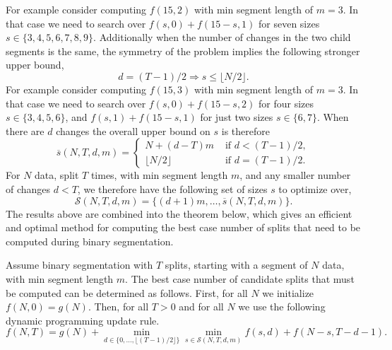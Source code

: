 \documentclass[algorithms,article,accept,oneauthor]{Definitions/mdpi}
\begin{document}
For example consider computing $f(15,2)$ with min segment length of $m=3$. 
In that case we need to search over $f(s,0)+f(15-s,1)$ for seven sizes $s\in\{3,4,5,6,7,8,9\}$.
Additionally when the number of changes in the two child segments is the same, the symmetry of the problem implies the following stronger upper bound,
\begin{equation}
    d = (T-1)/2 \Rightarrow s\leq \lfloor N/2 \rfloor.
\end{equation}
For example consider computing $f(15,3)$ with min segment length of $m=3$.
In that case we need to search over $f(s,0)+f(15-s,2)$ for four sizes $s\in\{3,4,5,6\}$, and $f(s,1)+f(15-s,1)$ for just two sizes $s\in\{6,7\}$.
When there are $d$ changes the overall upper bound on $s$ is therefore
\begin{equation}
\label{eq:sbar}
    \overline s(N,T,d,m) = \begin{cases}
    N+(d-T)m & \text{ if } d < (T-1)/2,\\
    \lfloor N/2 \rfloor & \text{ if } d = (T-1)/2.
    \end{cases}
\end{equation}
For $N$ data, split $T$ times, with min segment length $m$, and any smaller number of changes $d<T$, we therefore have the following set of sizes $s$ to optimize over,
\begin{equation}
\label{eq:S}
    \mathcal S(N,T,d,m) = \{(d+1)m, \dots, \overline s(N,T,d,m)\}.
\end{equation}
The results above are combined into the theorem below, which gives an efficient and optimal method for computing the best case number of splits that need to be computed during binary segmentation.
\begin{Theorem}
Assume binary segmentation with $T$ splits, starting with a segment of $N$ data, with min segment length $m$.
The best case number of candidate splits that must be computed can be determined as follows.
First, for all $N$ we initialize $f(N,0) = g(N)$. 
Then, for all $T>0$ and for all $N$ we use the following dynamic programming update rule.
\begin{equation}
    \label{eq:f}
    f(N,T) = g(N) + 
    \min_{
    d\in\{0,\dots,\lfloor (T-1)/2\rfloor\}
    }
    \min_{
    s\in\mathcal S(N,T,d,m)
    }
    f(s,d) + f(N-s,T-d-1).
\end{equation}
\end{Theorem}
\end{document}
